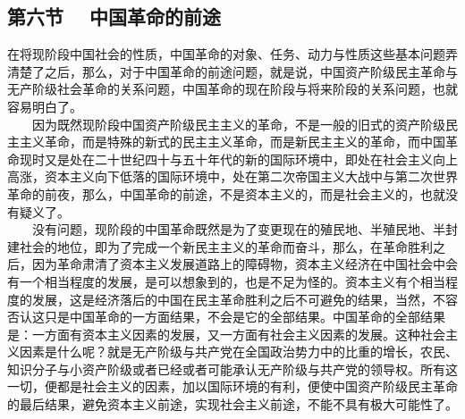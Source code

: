 \documentclass[cn,11pt,chinese]{elegantbook}
\def\myformat#1{\hfil\hfil #1}
\begin{document}
\subsection*{\myformat{第六节　 中国革命的前途}}
在将现阶段中国社会的性质，中国革命的对象、任务、动力与性质这些基本问题弄清楚了之后，那么，对于中国革命的前途问题，就是说，中国资产阶级民主革命与无产阶级社会革命的关系问题，中国革命的现在阶段与将来阶段的关系问题，也就容易明白了。\\
　　因为既然现阶段中国资产阶级民主主义的革命，不是一般的旧式的资产阶级民主主义革命，而是特殊的新式的民主主义革命，而是新民主主义的革命，而中国革命现时又是处在二十世纪四十与五十年代的新的国际环境中，即处在社会主义向上高涨，资本主义向下低落的国际环境中，处在第二次帝国主义大战中与第二次世界革命的前夜，那么，中国革命的前途，不是资本主义的，而是社会主义的，也就没有疑义了。\\
　　没有问题，现阶段的中国革命既然是为了变更现在的殖民地、半殖民地、半封建社会的地位，即为了完成一个新民主主义的革命而奋斗，那么，在革命胜利之后，因为革命肃清了资本主义发展道路上的障碍物，资本主义经济在中国社会中会有一个相当程度的发展，是可以想象到的，也是不足为怪的。资本主义有个相当程度的发展，这是经济落后的中国在民主革命胜利之后不可避免的结果，当然，不容否认这只是中国革命的一方面结果，不会是它的全部结果。中国革命的全部结果是：一方面有资本主义因素的发展，又一方面有社会主义因素的发展。这种社会主义因素是什么呢？就是无产阶级与共产党在全国政治势力中的比重的增长，农民、知识分子与小资产阶级或者已经或者可能承认无产阶级与共产党的领导权。所有这一切，便都是社会主义的因素，加以国际环境的有利，便使中国资产阶级民主革命的最后结果，避免资本主义前途，实现社会主义前途，不能不具有极大可能性了。\\
\end{document}
